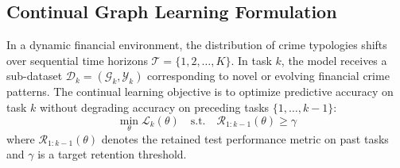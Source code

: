 \subsection{Continual Graph Learning Formulation}
In a dynamic financial environment, the distribution of crime typologies shifts over sequential time horizons $\mathcal{T} = \{1, 2, \dots, K\}$. In task $k$, the model receives a sub-dataset $\mathcal{D}_k = (\mathcal{G}_k, \mathcal{Y}_k)$ corresponding to novel or evolving financial crime patterns. The continual learning objective is to optimize predictive accuracy on task $k$ without degrading accuracy on preceding tasks $\{1, \dots, k-1\}$:
\begin{equation}
    \min_\theta \mathcal{L}_k(\theta) \quad \text{s.t.} \quad \mathcal{R}_{1:k-1}(\theta) \ge \gamma
\end{equation}
where $\mathcal{R}_{1:k-1}(\theta)$ denotes the retained test performance metric on past tasks and $\gamma$ is a target retention threshold.
